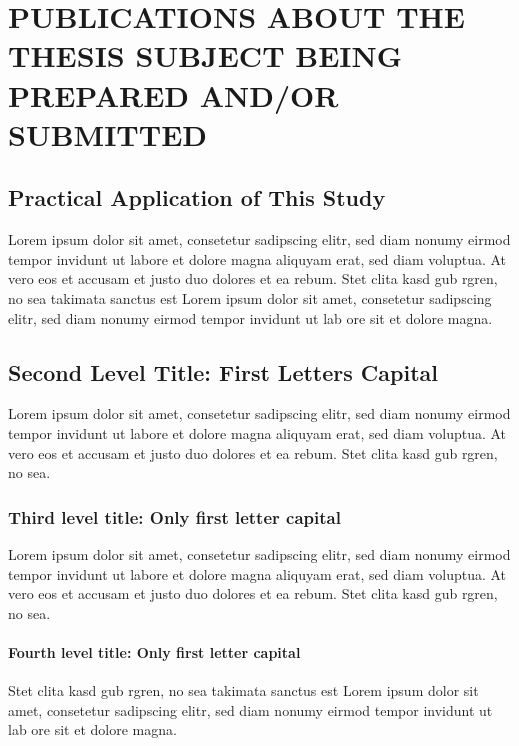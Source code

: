 \chapter{PUBLICATIONS ABOUT THE THESIS SUBJECT BEING PREPARED AND/OR SUBMITTED}\label{Ch8}
\vspace*{-12pt} %
\section{Practical Application of This Study}

Lorem ipsum dolor sit amet, consetetur sadipscing elitr, sed diam nonumy eirmod tempor invidunt ut labore et dolore magna aliquyam erat, sed diam voluptua. At vero eos et accusam et justo duo dolores et ea rebum. Stet clita kasd gub rgren, no sea takimata sanctus est Lorem ipsum dolor sit amet, consetetur sadipscing elitr, sed diam nonumy eirmod tempor invidunt ut lab ore sit et dolore magna.

\section{Second Level Title: First Letters Capital}

Lorem ipsum dolor sit amet, consetetur sadipscing elitr, sed diam nonumy eirmod tempor invidunt ut labore et dolore magna aliquyam erat, sed diam voluptua. At vero eos et accusam et justo duo dolores et ea rebum. Stet clita kasd gub rgren, no sea.

\subsection{Third level title: Only first letter capital}

Lorem ipsum dolor sit amet, consetetur sadipscing elitr, sed diam nonumy eirmod tempor invidunt ut labore et dolore magna aliquyam erat, sed diam voluptua. At vero eos et accusam et justo duo dolores et ea rebum. Stet clita kasd gub rgren, no sea.

\subsubsection{Fourth level title: Only first letter capital}

Stet clita kasd gub rgren, no sea takimata sanctus est Lorem ipsum dolor sit amet, consetetur sadipscing elitr, sed diam nonumy eirmod tempor invidunt ut lab ore sit et dolore magna.

